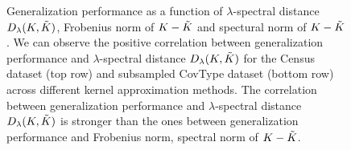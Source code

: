 \begin{figure}
\begin{tabular}{c c}
	\end{tabular}
	\caption{Generalization performance as a function of $\lambda$-spectral distance $D_{\lambda}(K,\tilde{K})$, Frobenius norm of $K - \tilde{K}$ and spectural norm of $K - \tilde{K}$. We can observe the positive correlation between generalization performance and $\lambda$-spectral distance $D_{\lambda}(K,\tilde{K})$ for the Census dataset (top row) and subsampled CovType dataset (bottom row) across different kernel approximation methods. The correlation between generalization performance and $\lambda$-spectral distance $D_{\lambda}(K,\tilde{K})$ is stronger than the ones between generalization performance and Frobenius norm, spectral norm of $K - \tilde{K}$.}
	\label{fig:specdist}
\end{figure}


